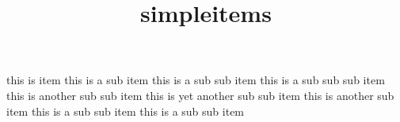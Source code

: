 \documentclass{ltjltxdoc}
\title{simpleitems}
\begin{document}
  \maketitle


  \begin{simpleitems}
  \item this is item
  \iitem this is a sub item
  \iiitem this is a sub sub item
  \iiiitem this is a sub sub sub item
  \iiitem this is another sub sub item
  \iiitem this is yet another sub sub item
  \iitem this is another sub item
  \iiitem this is a sub sub item
  \iiiitem this is a sub sub item
  \end{simpleitems}
\end{document}
